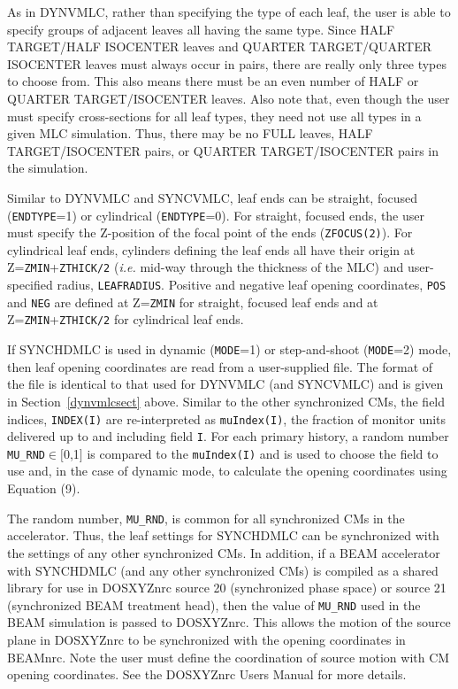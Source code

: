 \documentclass[12pt,twoside]{article}
\begin{document}
As in DYNVMLC, rather than specifying the type of each leaf, the user is able to specify groups
of adjacent leaves all having the same type.  Since HALF TARGET/HALF ISOCENTER leaves and
QUARTER TARGET/QUARTER ISOCENTER leaves must always occur in pairs, there are really
only three types to choose from.  This also means there must be an even number of
HALF or QUARTER TARGET/ISOCENTER leaves.  Also note that, even though the user
must specify cross-sections for all leaf types, they need not use all types
in a given MLC simulation.  Thus, there may be no FULL leaves, HALF TARGET/ISOCENTER pairs,
or QUARTER TARGET/ISOCENTER pairs in the simulation.

Similar to DYNVMLC and SYNCVMLC, leaf ends can be straight, focused ({\tt ENDTYPE}=1) or cylindrical
({\tt ENDTYPE}=0).  For straight, focused ends, the user must specify the Z-position of the
focal point of the ends ({\tt ZFOCUS(2)}).  For cylindrical leaf ends, cylinders defining the leaf
ends all have their origin at Z={\tt ZMIN}+{\tt ZTHICK/2} ({\it i.e.} mid-way through the thickness
of the MLC) and user-specified radius, {\tt LEAFRADIUS}.  Positive and negative leaf opening coordinates, {\tt POS} and {\tt NEG}
are defined at Z={\tt ZMIN} for straight, focused leaf ends and at Z={\tt ZMIN}+{\tt ZTHICK/2} for cylindrical
leaf ends.

If SYNCHDMLC is used in dynamic ({\tt MODE}=1) or step-and-shoot ({\tt MODE}=2) mode, then
leaf opening coordinates are read from a user-supplied file.  The format of the file
is identical to that used for DYNVMLC (and SYNCVMLC) and is given in
Section~\ref{dynvmlcsect} above.  Similar to the other synchronized CMs, the field indices,
{\tt INDEX(I)} are re-interpreted as {\tt muIndex(I)}, the fraction of monitor units delivered
up to and including field {\tt I}.  For each primary history, a random number {\tt MU\_RND}$\in[$0,1$]$ is
compared to the {\tt muIndex(I)} and is used to choose the field to use and,
in the case of dynamic mode, to calculate the opening coordinates using Equation (9).

The random number, {\tt MU\_RND}, is common for all synchronized CMs in the accelerator.  Thus, the
leaf settings for SYNCHDMLC can be synchronized with the settings of any other synchronized CMs.  In addition,
if a BEAM accelerator with SYNCHDMLC (and any other synchronized CMs) is compiled as a shared library for use
in DOSXYZnrc source 20 (synchronized phase space) or source 21 (synchronized BEAM treatment head), then
the value of {\tt MU\_RND} used in the BEAM simulation is passed to DOSXYZnrc.  This allows the motion of the source
plane in DOSXYZnrc to be synchronized with the opening coordinates in BEAMnrc.  Note the user must
define the coordination of source motion with CM opening coordinates.  See the DOSXYZnrc Users Manual\cite{Wa05}
for more details.
\end{document}
